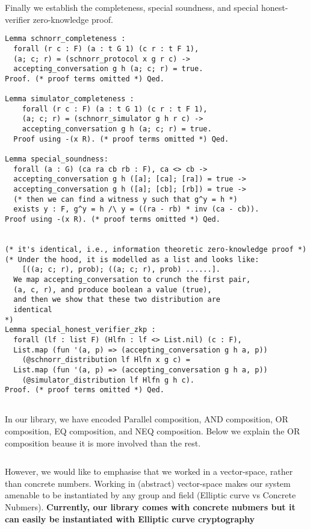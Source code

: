 \documentclass[sigconf]{acmart}
\begin{document}
Finally we establish the completeness, special soundness, 
and special honest-verifier zero-knowledge proof. 


\begin{lstlisting}[language=Coq]
Lemma schnorr_completeness : 
  forall (r c : F) (a : t G 1) (c r : t F 1),
  (a; c; r) = (schnorr_protocol x g r c) ->
  accepting_conversation g h (a; c; r) = true.
Proof. (* proof terms omitted *) Qed.

Lemma simulator_completeness : 
    forall (r c : F) (a : t G 1) (c r : t F 1),
    (a; c; r) = (schnorr_simulator g h r c) ->
    accepting_conversation g h (a; c; r) = true.
  Proof using -(x R). (* proof terms omitted *) Qed. 

Lemma special_soundness: 
  forall (a : G) (ca ra cb rb : F), ca <> cb ->
  accepting_conversation g h ([a]; [ca]; [ra]) = true ->  
  accepting_conversation g h ([a]; [cb]; [rb]) = true ->
  (* then we can find a witness y such that g^y = h *)
  exists y : F, g^y = h /\ y = ((ra - rb) * inv (ca - cb)).
Proof using -(x R). (* proof terms omitted *) Qed.


(* it's identical, i.e., information theoretic zero-knowledge proof *)
(* Under the hood, it is modelled as a list and looks like:
    [((a; c; r), prob); ((a; c; r), prob) ......].
  We map accepting_conversation to crunch the first pair, 
  (a, c, r), and produce boolean a value (true), 
  and then we show that these two distribution are 
  identical 
*)
Lemma special_honest_verifier_zkp : 
  forall (lf : list F) (Hlfn : lf <> List.nil) (c : F), 
  List.map (fun '(a, p) => (accepting_conversation g h a, p))
    (@schnorr_distribution lf Hlfn x g c) = 
  List.map (fun '(a, p) => (accepting_conversation g h a, p))
    (@simulator_distribution lf Hlfn g h c).
Proof. (* proof terms omitted *) Qed. 


\end{lstlisting}


In our library, we have encoded Parallel composition, 
AND composition, OR composition, EQ composition, and 
NEQ composition. Below we explain the OR composition
beause it is more involved than the rest. 

\begin{lstlisting}[language=Coq]

\end{lstlisting}




 
  However, we would like 
  to emphasise that we worked in a vector-space, rather 
  than concrete numbers. Working in (abstract) vector-space makes our system 
  amenable to be instantiated by any group and field 
  (Elliptic curve vs Concrete Nubmers). \textbf{Currently, 
  our library comes with concrete nubmers but it can easily be 
  instantiated with Elliptic curve cryptography}
\end{document}
